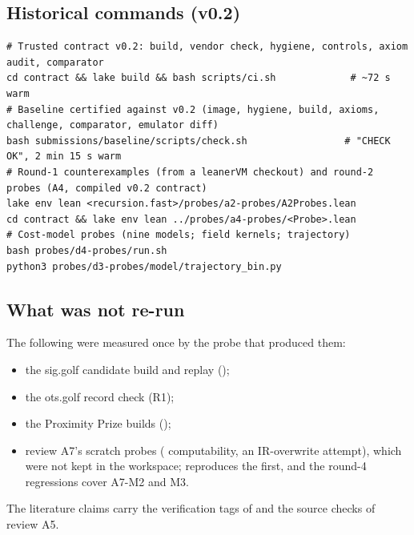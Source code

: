\subsection{Historical commands (v0.2)}

\begin{Verbatim}[fontsize=\scriptsize,frame=single,framerule=0.3pt,rulecolor=\color{black!30},framesep=4pt]
# Trusted contract v0.2: build, vendor check, hygiene, controls, axiom audit, comparator
cd contract && lake build && bash scripts/ci.sh             # ~72 s warm
# Baseline certified against v0.2 (image, hygiene, build, axioms, challenge, comparator, emulator diff)
bash submissions/baseline/scripts/check.sh                 # "CHECK OK", 2 min 15 s warm
# Round-1 counterexamples (from a leanerVM checkout) and round-2 probes (A4, compiled v0.2 contract)
lake env lean <recursion.fast>/probes/a2-probes/A2Probes.lean
cd contract && lake env lean ../probes/a4-probes/<Probe>.lean
# Cost-model probes (nine models; field kernels; trajectory)
bash probes/d4-probes/run.sh
python3 probes/d3-probes/model/trajectory_bin.py
\end{Verbatim}

\subsection{What was not re-run}

The following were measured once by the probe that produced them:
\begin{itemize}[nosep]
\item the sig.golf candidate build and replay ();
\item the ots.golf record check (R1);
\item the Proximity Prize builds ();
\item review A7's scratch probes ( computability, an IR-overwrite attempt), which were not kept
  in the workspace;  reproduces the first, and the
  round-4 regressions  cover A7-M2 and M3.
\end{itemize}
The literature claims carry the verification tags of  and the source
checks of review A5.
